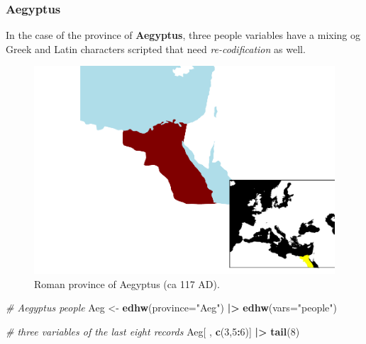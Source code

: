 \documentclass[a4paper,11pt]{memoir}
\newenvironment{Shaded}{\begin{snugshade}}{\end{snugshade}}
\newcommand{\CommentTok}[1]{\textcolor[rgb]{0.56,0.35,0.01}{\textit{#1}}}
\newcommand{\DataTypeTok}[1]{\textcolor[rgb]{0.13,0.29,0.53}{#1}}
\newcommand{\DecValTok}[1]{\textcolor[rgb]{0.00,0.00,0.81}{#1}}
\newcommand{\ErrorTok}[1]{\textcolor[rgb]{0.64,0.00,0.00}{\textbf{#1}}}
\newcommand{\KeywordTok}[1]{\textcolor[rgb]{0.13,0.29,0.53}{\textbf{#1}}}
\newcommand{\NormalTok}[1]{#1}
\newcommand{\OperatorTok}[1]{\textcolor[rgb]{0.81,0.36,0.00}{\textbf{#1}}}
\newcommand{\StringTok}[1]{\textcolor[rgb]{0.31,0.60,0.02}{#1}}
\begin{document}
\hypertarget{aegyptus}{%
\subsubsection{Aegyptus}\label{aegyptus}}

In the case of the province of \textbf{Aegyptus}, three people variables
have a mixing og Greek and Latin characters scripted that need
\emph{re-codification} as well.

\begin{figure}[!h]

{\centering \includegraphics[width=0.25\linewidth]{img/unnamed-chunk-33-1} 

}

\caption{Roman province of Aegyptus (ca 117 AD).}\label{fig:unnamed-chunk-33}
\end{figure}

\begin{Shaded}
\begin{Highlighting}[]
\CommentTok{# Aegyptus people}
\NormalTok{Aeg <-}\StringTok{ }\KeywordTok{edhw}\NormalTok{(}\DataTypeTok{province=}\StringTok{"Aeg"}\NormalTok{) }\OperatorTok{|}\ErrorTok{>}\StringTok{ }
\StringTok{  }\KeywordTok{edhw}\NormalTok{(}\DataTypeTok{vars=}\StringTok{"people"}\NormalTok{)}
\end{Highlighting}
\end{Shaded}

\begin{Shaded}
\begin{Highlighting}[]
\CommentTok{# three variables of the last eight records}
\NormalTok{Aeg[ , }\KeywordTok{c}\NormalTok{(}\DecValTok{3}\NormalTok{,}\DecValTok{5}\OperatorTok{:}\DecValTok{6}\NormalTok{)] }\OperatorTok{|}\ErrorTok{>}\StringTok{ }
\StringTok{  }\KeywordTok{tail}\NormalTok{(}\DecValTok{8}\NormalTok{)}
\end{Highlighting}
\end{Shaded}
\end{document}
